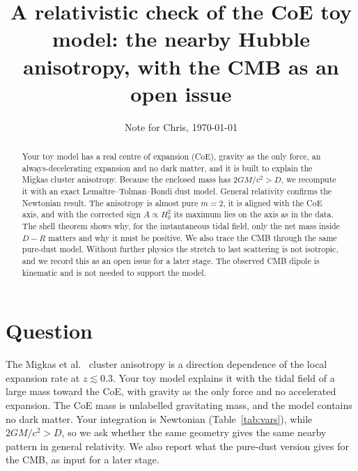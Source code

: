 \documentclass[10pt,twocolumn,letterpaper]{article}
\title{\vspace{-0.6in}\Large A relativistic check of the CoE toy model: the nearby Hubble anisotropy, with the CMB as an open issue}
\author{Note for Chris, \today}
\date{\vspace{-0.35in}}
\begin{document}
\maketitle

\begin{abstract}\noindent
Your toy model has a real centre of expansion (CoE), gravity as the only force, an always-decelerating expansion and no dark matter, and it is built to explain the Migkas cluster anisotropy. Because the enclosed mass has $2GM/c^2>D$, we recompute it with an exact Lema\^itre--Tolman--Bondi dust model. General relativity confirms the Newtonian result. The anisotropy is almost pure $m=2$, it is aligned with the CoE axis, and with the corrected sign $A\propto H_0^2$ its maximum lies on the axis as in the data. The shell theorem shows why, for the instantaneous tidal field, only the net mass inside $D-R$ matters and why it must be positive. We also trace the CMB through the same pure-dust model. Without further physics the stretch to last scattering is not isotropic, and we record this as an open issue for a later stage. The observed CMB dipole is kinematic and is not needed to support the model.
\end{abstract}

\section{Question}
The Migkas et al.\ \cite{Migkas2020,Migkas2021} cluster anisotropy is a direction dependence of the local expansion rate at $z\lesssim0.3$. Your toy model explains it with the tidal field of a large mass toward the CoE, with gravity as the only force and no accelerated expansion. The CoE mass is unlabelled gravitating mass, and the model contains no dark matter. Your integration is Newtonian (Table~\ref{tab:vars}), while $2GM/c^2>D$, so we ask whether the same geometry gives the same nearby pattern in general relativity. We also report what the pure-dust version gives for the CMB, as input for a later stage.
\end{document}
